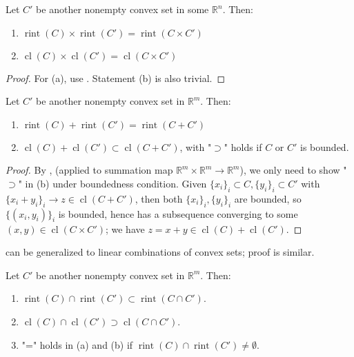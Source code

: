 \begin{prop}
	\label{prop:012-product-rules}
	Let $C'$ be another nonempty convex set in some $\mathbb{R}^n$. Then:
	\begin{enumerate}[label=(\alph*)]
		\item $\operatorname{rint}(C)\times\operatorname{rint}(C')=\operatorname{rint}(C\times C')$
		\item $\operatorname{cl}(C)\times\operatorname{cl}(C')=\operatorname{cl}(C\times C')$
	\end{enumerate}
\end{prop}

\begin{proof}
	For (a), use . Statement (b) is also trivial.
\end{proof}

\begin{prop}
	\label{prop:012-sum-rules}
	Let $C'$ be another nonempty convex set in $\mathbb{R}^m$. Then:
	\begin{enumerate}[label=(\alph*)]
		\item $\operatorname{rint}(C)+\operatorname{rint}(C')=\operatorname{rint}(C+C')$
		\item $\operatorname{cl}(C)+\operatorname{cl}(C')\subset\operatorname{cl}(C+C')$, with "$\supset$" holds if $C$ or $C'$ is bounded.
	\end{enumerate}
\end{prop}

\begin{proof}
	By ,  (applied to summation map $\mathbb{R}^{m}\times\mathbb{R}^{m}\to \mathbb{R}^m$), we only need to show "$\supset$" in (b) under boundedness condition. Given $\{x_i\}_i\subset C,\{y_i\}_i\subset C'$ with $\{x_i+y_i\}_i\to z\in \operatorname{cl}(C+C')$, then both $\{x_i\}_i,\{y_i\}_i$ are bounded, so $\{(x_i,y_i)\}_i$ is bounded, hence has a subsequence converging to some $(x,y)\in \operatorname{cl}(C\times C')$; we have $z=x+y\in \operatorname{cl}(C)+\operatorname{cl}(C')$.
\end{proof}

\begin{rmrk}
	 can be generalized to linear combinations of convex sets; proof is similar.
\end{rmrk}

\begin{prop}
	\label{prop:012-fin-intersection-rules}
	Let $C'$ be another nonempty convex set in $\mathbb{R}^m$. Then:
	\begin{enumerate}[label=(\alph*)]
		\item $\operatorname{rint}(C)\cap\operatorname{rint}(C')\subset\operatorname{rint}(C\cap C')$.
		\item $\operatorname{cl}(C)\cap\operatorname{cl}(C')\supset\operatorname{cl}(C\cap C')$.
		\item "=" holds in (a) and (b) if $\operatorname{rint}(C)\cap\operatorname{rint}(C')\neq\emptyset$.
	\end{enumerate}
\end{prop}

